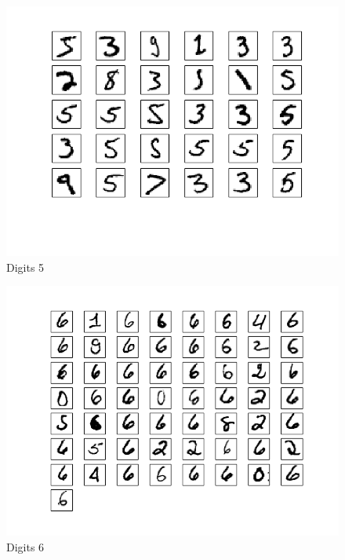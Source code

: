 \documentclass[10pt]{article}
\begin{document}
\begin{figure}
\begin{center}
\includegraphics[scale=0.5]{medoidsA5}
\caption{Digits 5}
\end{center}
\end{figure}
\begin{figure}
\begin{center}
\includegraphics[scale=0.5]{medoidsA6}
\caption{Digits 6}
\end{center}
\end{figure}
\end{document}
